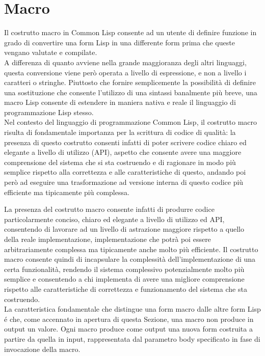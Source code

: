 \section{Macro}

Il costrutto macro in Common Lisp consente ad un utente di definire funzione
in grado di convertire una form Lisp in una differente form prima che queste
vengano valutate e compilate.\\

A differenza di quanto avviene nella grande maggioranza degli altri linguaggi,
questa conversione viene però operata a livello di espressione, e non a
livello i caratteri o stringhe. Piuttosto che fornire semplicemente la
possibilità di definire una sostituzione che consente l’utilizzo di una
sintassi banalmente più breve, una macro Lisp consente di estendere in maniera
nativa e reale il linguaggio di programmazione Lisp stesso.\\

Nel contesto del linguaggio di programmazione Common Lisp, il costrutto macro
risulta di fondamentale importanza per la scrittura di codice di qualità: la
presenza di questo costrutto consenti infatti di poter scrivere codice chiaro
ed elegante a livello di utilizzo (API), aspetto che consente avere una
maggiore comprensione del sistema che si sta costruendo e di ragionare in modo
più semplice rispetto alla correttezza e alle caratteristiche di questo,
andando poi però ad eseguire una trasformazione ad versione interna di questo
codice più efficiente ma tipicamente più complessa.

La presenza del costrutto macro consente infatti di produrre codice
particolarmente conciso, chiaro ed elegante a livello di utilizzo ed API,
consentendo di lavorare ad un livello di astrazione maggiore rispetto a quello
della reale implementazione, implementazione che potrà poi essere
arbitrariamente complessa ma tipicamente anche molto più efficiente. Il
costrutto macro consente quindi di incapsulare la complessità
dell’implementazione di una certa funzionalità, rendendo il sistema
complessivo potenzialmente molto più semplice e consentendo a chi implementa
di avere una migliore comprensione rispetto alle caratteristiche di
correttezza e funzionamento del sistema che sta costruendo.\\

La caratteristica fondamentale che distingue una form macro dalle altre form
Lisp é che, come accennato in apertura di questa Sezione, una macro non
produce in output un valore. Ogni macro produce come output una nuova form
costruita a partire da quella in input, rappresentata dal parametro body
specificato in fase di invocazione della macro.\\

